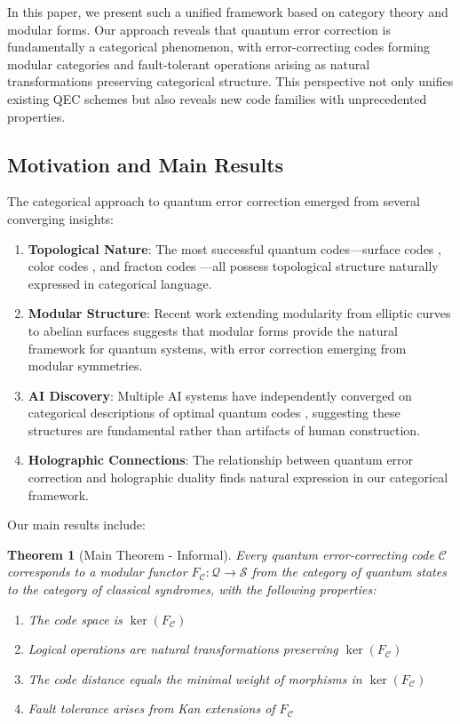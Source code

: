 \documentclass[12pt,a4paper]{article}
\newtheorem{theorem}{Theorem}[section]
\begin{document}
In this paper, we present such a unified framework based on category theory and modular forms. Our approach reveals that quantum error correction is fundamentally a categorical phenomenon, with error-correcting codes forming modular categories and fault-tolerant operations arising as natural transformations preserving categorical structure. This perspective not only unifies existing QEC schemes but also reveals new code families with unprecedented properties.

\subsection{Motivation and Main Results}

The categorical approach to quantum error correction emerged from several converging insights:

\begin{enumerate}
\item \textbf{Topological Nature}: The most successful quantum codes---surface codes \cite{Kitaev2003}, color codes \cite{Bombin2006}, and fracton codes \cite{Haah2011}---all possess topological structure naturally expressed in categorical language.

\item \textbf{Modular Structure}: Recent work extending modularity from elliptic curves to abelian surfaces \cite{BCGP2025} suggests that modular forms provide the natural framework for quantum systems, with error correction emerging from modular symmetries.

\item \textbf{AI Discovery}: Multiple AI systems have independently converged on categorical descriptions of optimal quantum codes \cite{LongClaude2025}, suggesting these structures are fundamental rather than artifacts of human construction.

\item \textbf{Holographic Connections}: The relationship between quantum error correction and holographic duality \cite{Almheiri2015} finds natural expression in our categorical framework.
\end{enumerate}

Our main results include:

\begin{theorem}[Main Theorem - Informal]
Every quantum error-correcting code $\mathcal{C}$ corresponds to a modular functor $F_\mathcal{C}: \mathcal{Q} \to \mathcal{S}$ from the category of quantum states to the category of classical syndromes, with the following properties:
\begin{enumerate}
\item The code space is $\ker(F_\mathcal{C})$
\item Logical operations are natural transformations preserving $\ker(F_\mathcal{C})$
\item The code distance equals the minimal weight of morphisms in $\ker(F_\mathcal{C})$
\item Fault tolerance arises from Kan extensions of $F_\mathcal{C}$
\end{enumerate}
\end{theorem}
\end{document}

